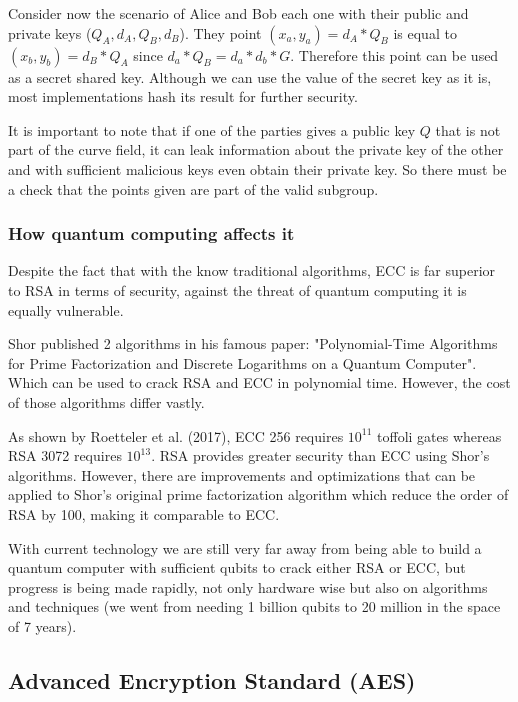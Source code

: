Consider now the scenario of Alice and Bob each one with their public and
private keys ($Q_A, d_A, Q_B, d_B$). They point $(x_a, y_a) = d_A * Q_B$ is
equal to $(x_b, y_b) = d_B * Q_A$ since $d_a * Q_B = d_a * d_b * G$. Therefore
this point can be used as a secret shared key. Although we can use the value of
the secret key as it is, most implementations hash its result for further
security.

It is important to note that if one of the parties gives a public key $Q$ that
is not part of the curve field, it can leak information about the private key of
the other and with sufficient malicious keys even obtain their private key. So
there must be a check that the points given are part of the valid subgroup.
\cite{pernul_practical_2015}


\subsubsection{How quantum computing affects it}

Despite the fact that with the know traditional algorithms, ECC is far superior
to RSA in terms of security, against the threat of quantum computing it is
equally vulnerable.

Shor published 2 algorithms in his famous paper: "Polynomial-Time Algorithms for
Prime Factorization and Discrete Logarithms on a Quantum Computer".
\cite{shor_polynomial-time_1997} Which can be
used to crack RSA and ECC in polynomial time. However, the cost of those
algorithms differ vastly.

As shown by Roetteler et al. (2017), ECC 256 requires $10^{11}$  toffoli gates
whereas RSA 3072 requires $10^{13}$. RSA provides greater security than ECC
using Shor's algorithms. However, there are improvements and optimizations that
can be applied to Shor's original prime factorization algorithm which reduce the
order of RSA by 100, making it comparable to ECC.

With current technology we are still very far away from being able to build a
quantum computer with sufficient qubits to crack either RSA or ECC, but progress
is being made rapidly, not only hardware wise but also on algorithms and
techniques (we went from needing 1 billion qubits to 20 million in the space of 7 years).
\cite{baumhof_are_2019}

\pagebreak

\subsection{Advanced Encryption Standard (AES)}

